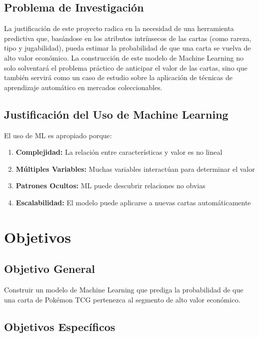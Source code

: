 \documentclass[12pt,letterpaper]{article}
\begin{document}
\subsection{Problema de Investigación}

La justificación de este proyecto radica en la necesidad de una herramienta predictiva que, basándose en los atributos intrínsecos de las cartas (como rareza, tipo y jugabilidad), pueda estimar la probabilidad de que una carta se vuelva de alto valor económico. La construcción de este modelo de Machine Learning no solo solventará el problema práctico de anticipar el valor de las cartas, sino que también servirá como un caso de estudio sobre la aplicación de técnicas de aprendizaje automático en mercados coleccionables.

\subsection{Justificación del Uso de Machine Learning}

El uso de ML es apropiado porque:

\begin{enumerate}
    \item \textbf{Complejidad:} La relación entre características y valor es no lineal
    \item \textbf{Múltiples Variables:} Muchas variables interactúan para determinar el valor
    \item \textbf{Patrones Ocultos:} ML puede descubrir relaciones no obvias
    \item \textbf{Escalabilidad:} El modelo puede aplicarse a nuevas cartas automáticamente
\end{enumerate}

\section{Objetivos}

\subsection{Objetivo General}

Construir un modelo de Machine Learning que prediga la probabilidad de que una carta de Pokémon TCG pertenezca al segmento de alto valor económico.

\subsection{Objetivos Específicos}
\end{document}
